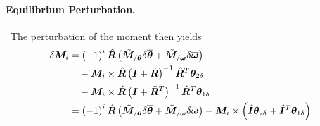 \documentclass[10pt,fleqn,subeqn]{report}
\newcommand{\T}[1]{\bm{#1}}
\begin{document}
\paragraph{Equilibrium Perturbation.} \
The perturbation of the moment then yields
\begin{align}
	\delta\T{M}_i
	&= \plbr{-1}^i \hat{\T{R}} \plbr{
		\tilde{\T{M}}_{/\T{\theta}} \delta\overline{\T{\theta}}
		+ \tilde{\T{M}}_{/\T{\omega}} \delta\overline{\T{\omega}}
	} \nonumber \\
	& \mbox{\hspace{10pt}} - \T{M}_i \times \hat{\T{R}}
		\plbr{\T{I} + \tilde{\T{R}}}^{-1} \hat{\T{R}}^T \T{\theta}_{2\delta}
	\nonumber \\
	& \mbox{\hspace{10pt}} - \T{M}_i \times \hat{\T{R}} 
		\plbr{\T{I} + \tilde{\T{R}}^T}^{-1} \hat{\T{R}}^T \T{\theta}_{1\delta} \nonumber \\
	&= \plbr{-1}^i \hat{\T{R}} \plbr{
		\tilde{\T{M}}_{/\T{\theta}} \delta\overline{\T{\theta}}
		+ \tilde{\T{M}}_{/\T{\omega}} \delta\overline{\T{\omega}}
	} - \T{M}_i \times \plbr{
		\hat{\T{I}} \T{\theta}_{2\delta}
		+ \hat{\T{I}}^T \T{\theta}_{1\delta}
	} .
\end{align}
\end{document}
